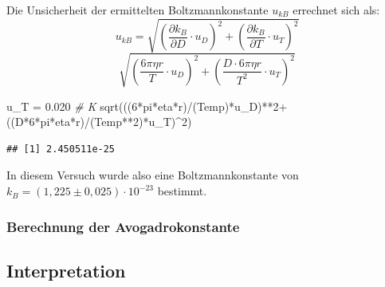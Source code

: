 \documentclass[
  9pt,
]{article}
\newenvironment{Shaded}{\begin{snugshade}}{\end{snugshade}}
\newcommand{\CommentTok}[1]{\textcolor[rgb]{0.56,0.35,0.01}{\textit{#1}}}
\newcommand{\DecValTok}[1]{\textcolor[rgb]{0.00,0.00,0.81}{#1}}
\newcommand{\FloatTok}[1]{\textcolor[rgb]{0.00,0.00,0.81}{#1}}
\newcommand{\FunctionTok}[1]{\textcolor[rgb]{0.00,0.00,0.00}{#1}}
\newcommand{\NormalTok}[1]{#1}
\newcommand{\OtherTok}[1]{\textcolor[rgb]{0.56,0.35,0.01}{#1}}
\newcommand{\SpecialCharTok}[1]{\textcolor[rgb]{0.00,0.00,0.00}{#1}}
\begin{document}
Die Unsicherheit der ermittelten Boltzmannkonstante \(u_{kB}\) errechnet
sich als:
\[u_{kB} = \sqrt{(\frac{\partial k_B}{\partial D}\cdot u_D)^2 + (\frac{\partial k_B}{\partial T}\cdot u_T)^2}\]
\[\sqrt{(\frac{6\pi \eta r}{T}\cdot u_D)^2+(\frac{D\cdot 6\pi \eta r}{T^2} \cdot u_T)^2}\]

\begin{Shaded}
\begin{Highlighting}[]
\NormalTok{u\_T }\OtherTok{=} \FloatTok{0.020} \CommentTok{\# K}
\FunctionTok{sqrt}\NormalTok{(((}\DecValTok{6}\SpecialCharTok{*}\NormalTok{pi}\SpecialCharTok{*}\NormalTok{eta}\SpecialCharTok{*}\NormalTok{r)}\SpecialCharTok{/}\NormalTok{(Temp)}\SpecialCharTok{*}\NormalTok{u\_D)}\SpecialCharTok{**}\DecValTok{2}\SpecialCharTok{+}\NormalTok{((D}\SpecialCharTok{*}\DecValTok{6}\SpecialCharTok{*}\NormalTok{pi}\SpecialCharTok{*}\NormalTok{eta}\SpecialCharTok{*}\NormalTok{r)}\SpecialCharTok{/}\NormalTok{(Temp}\SpecialCharTok{**}\DecValTok{2}\NormalTok{)}\SpecialCharTok{*}\NormalTok{u\_T)}\SpecialCharTok{\^{}}\DecValTok{2}\NormalTok{)}
\end{Highlighting}
\end{Shaded}

\begin{verbatim}
## [1] 2.450511e-25
\end{verbatim}

In diesem Versuch wurde also eine Boltzmannkonstante von
\(k_B = (1,225 \pm 0,025) \cdot 10^{-23}\) bestimmt.

\hypertarget{berechnung-der-avogadrokonstante}{%
\subsubsection{Berechnung der
Avogadrokonstante}\label{berechnung-der-avogadrokonstante}}

\hypertarget{interpretation}{%
\subsection{Interpretation}\label{interpretation}}
\end{document}
